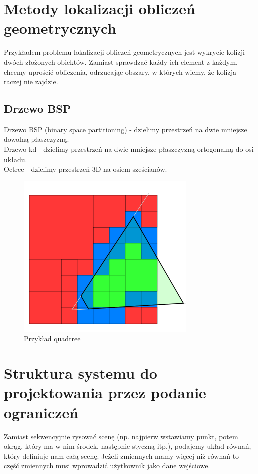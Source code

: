 \documentclass[12pt]{article}
\begin{document}
\section{Metody lokalizacji obliczeń geometrycznych}
Przykładem problemu lokalizacji obliczeń geometrycznych jest wykrycie kolizji dwóch złożonych obiektów. Zamiast sprawdzać każdy ich element z każdym, chcemy uprościć obliczenia, odrzucając obszary, w których wiemy, że kolizja raczej nie zajdzie.

\subsection{Drzewo BSP}
Drzewo BSP (binary space partitioning) - dzielimy przestrzeń na dwie mniejsze dowolną płaszczyzną.\\
Drzewo kd - dzielimy przestrzeń na dwie mniejsze płaszczyzną ortogonalną do osi układu.\\
Octree - dzielimy przestrzeń 3D na osiem sześcianów.\\

\begin{figure}[h!]
	\centering
	\includegraphics[scale=0.5]{Pictures/octree}
	\caption{Przykład quadtree}
\end{figure}

\section{Struktura systemu do projektowania przez podanie ograniczeń}
Zamiast sekwencyjnie rysować scenę (np. najpierw wstawiamy punkt, potem okrąg, który ma w nim środek, następnie styczną itp.), podajemy układ równań, który definiuje nam całą scenę. Jeżeli zmiennych mamy więcej niż równań to część zmiennych musi wprowadzić użytkownik jako dane wejściowe.
\end{document}
